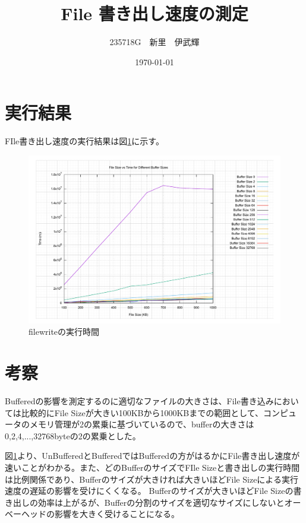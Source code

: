 \documentclass[a4paper, 11pt, titlepage]{jsarticle}
\title{File 書き出し速度の測定}
\author{235718G　新里　伊武輝 }
\date{\today}
\begin{document}
\maketitle

\clearpage

\section{実行結果}
FIle書き出し速度の実行結果は図\ref{fig:filewrite1}に示す。

\begin{figure}[htbp]
	\centering
	\includegraphics[width=120mm]{write_times.pdf}
	\caption{filewriteの実行時間}
	\label{fig:filewrite1}
\end{figure}

\section{考察}
Bufferedの影響を測定するのに適切なファイルの大きさは、File書き込みにおいては比較的にFile Sizeが大きい100KBから1000KBまでの範囲として、コンピュータのメモリ管理が2の累乗に基づいているので、bufferの大きさは0,2,4,...,32768byteの2の累乗とした。

図\ref{fig:filewrite1}より、UnBufferedとBufferedではBufferedの方がはるかにFile書き出し速度が速いことがわかる。また、どのBufferのサイズでFIle Sizeと書き出しの実行時間は比例関係であり、Bufferのサイズが大きければ大きいほどFile Sizeによる実行速度の遅延の影響を受けにくくなる。
Bufferのサイズが大きいほどFile Sizeの書き出しの効率は上がるが、Bufferの分割のサイズを適切なサイズにしないとオーベーヘッドの影響を大きく受けることになる。
\end{document}
